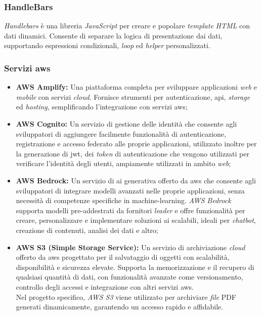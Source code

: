 \subsubsection{HandleBars}

\textit{Handlebars} è una libreria \textit{JavaScript} per creare e popolare \textit{template} \textit{HTML} con dati dinamici. 
Consente di separare la logica di presentazione dai dati, supportando espressioni condizionali, \textit{loop} ed \textit{helper} personalizzati.

\subsubsection{Servizi \gls{aws}}

\begin{itemize}
\item \textbf{AWS Amplify:} Una piattaforma completa per sviluppare applicazioni \textit{web} e \textit{mobile} con servizi \textit{cloud}. 
Fornisce strumenti per autenticazione, \gls{api}, \textit{storage} ed \textit{hosting}, semplificando l'integrazione con servizi \gls{aws};
\item \textbf{AWS Cognito:} Un servizio di gestione delle identità che consente agli sviluppatori di aggiungere facilmente funzionalità di autenticazione, registrazione e accesso federato alle proprie applicazioni,
utilizzato inoltre per la generazione di \gls{jwt}, dei \textit{token} di autenticazione che vengono utilizzati per verificare l'identità degli utenti, ampiamente utilizzati in ambito \textit{web};
\item \textbf{AWS Bedrock:} Un servizio di \gls{ai} generativa offerto da \gls{aws} che consente agli sviluppatori di integrare modelli avanzati nelle proprie applicazioni, senza necessità di competenze specifiche in \gls{machine-learning}. 
\textit{AWS Bedrock} supporta modelli pre-addestrati da fornitori \textit{leader} e offre funzionalità per creare, personalizzare e implementare soluzioni \gls{ai} scalabili, ideali per \textit{chatbot}, creazione di contenuti, analisi dei dati e altro;
\item \textbf{AWS S3 (Simple Storage Service):} Un servizio di archiviazione \textit{cloud} offerto da \gls{aws} progettato per il salvataggio di oggetti con scalabilità, disponibilità e sicurezza elevate.
Supporta la memorizzazione e il recupero di qualsiasi quantità di dati, con funzionalità avanzate come versionamento, controllo degli accessi e integrazione con altri servizi \gls{aws}. \\
Nel progetto specifico, \textit{AWS S3} viene utilizzato per archiviare \textit{file} PDF generati dinamicamente, garantendo un accesso rapido e affidabile.
\end{itemize}

